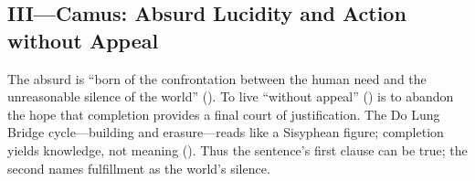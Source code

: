 \subsection*{III—Camus: Absurd Lucidity and Action without Appeal}
\label{ssec:iii-camus}
The absurd is “born of the confrontation between the human need and the unreasonable silence of the world” (\parencite[p.~28]{CamusSisyphus1991}). To live “without appeal” (\parencite[p.~54]{CamusSisyphus1991}) is to abandon the hope that completion provides a final court of justification. The Do Lung Bridge cycle—building and erasure—reads like a Sisyphean figure; completion yields knowledge, not meaning (\parencite[pp.~121--123]{CamusSisyphus1991}). Thus the sentence’s first clause can be true; the second names fulfillment as the world’s silence.
